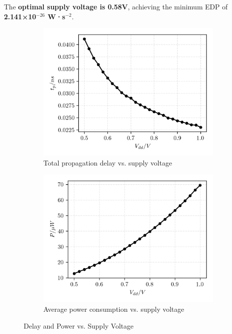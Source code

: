 \documentclass[UTF8,12pt,a4paper]{ctexart}
\begin{document}
The \textbf{optimal supply voltage is 0.58V}, achieving the minimum EDP of \textbf{2.141×10$^{-26}$ W·s$^{-2}$}.

\begin{figure}[htbp]
    \centering
    \begin{subfigure}[b]{0.45\textwidth} %
        \centering
        \includegraphics[width=\textwidth]{Task4/tp_total_vs_volts.png} 
        \caption{Total propagation delay vs. supply voltage}
        \label{fig:task4_delay}
    \end{subfigure}
    \hfill %
    \begin{subfigure}[b]{0.45\textwidth}
        \centering
        \includegraphics[width=\textwidth]{Task4/power_vs_volts.png} 
        \caption{Average power consumption vs. supply voltage}
        \label{fig:task4_power}
    \end{subfigure}
    \caption{Delay and Power vs. Supply Voltage}
    \label{fig:task4_delay_power}
\end{figure}
\end{document}
